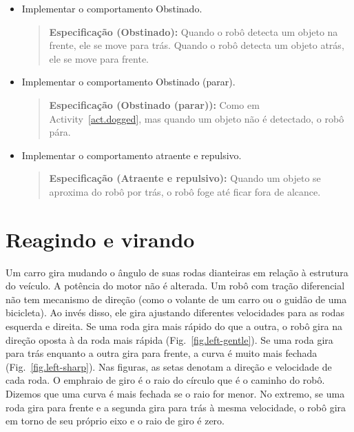 \begin{framed}
\begin{itemize}
\item Implementar o comportamento Obstinado.
\begin{quote}
\normalsize\noindent\textbf{Especificação (Obstinado):} Quando o robô detecta um objeto na frente, ele se move para trás. Quando o robô detecta um objeto atrás, ele se move para frente.
\end{quote}
\end{itemize}
\end{framed}

\begin{framed}
\begin{itemize}
\item Implementar o comportamento Obstinado (parar).
\begin{quote}
\normalsize\noindent\textbf{Especificação (Obstinado (parar)):} Como em Activity~\ref{act.dogged}, mas quando um objeto não é detectado, o robô pára.
\end{quote}
\end{itemize}
\end{framed}

\begin{framed}
\begin{itemize}
\item Implementar o comportamento atraente e repulsivo.
\begin{quote}
\normalsize\noindent\textbf{Especificação (Atraente e repulsivo):} Quando um objeto se aproxima do robô por trás, o robô foge até ficar fora de alcance.
\end{quote}
\end{itemize}
\end{framed}

\section{Reagindo e virando}\label{s.turning}

Um carro gira mudando o ângulo de suas rodas dianteiras em relação à estrutura do veículo. A potência do motor não é alterada. Um robô com tração diferencial não tem mecanismo de direção (como o volante de um carro ou o guidão de uma bicicleta). Ao invés disso, ele gira ajustando diferentes velocidades para as rodas esquerda e direita. Se uma roda gira mais rápido do que a outra, o robô gira na direção oposta à da roda mais rápida (Fig.~\ref{fig.left-gentle}). Se uma roda gira para trás enquanto a outra gira para frente, a curva é muito mais fechada (Fig.~\ref{fig.left-sharp}). Nas figuras, as setas denotam a direção e velocidade de cada roda. O emph{raio de giro} é o raio do círculo que é o caminho do robô. Dizemos que uma curva é mais fechada se o raio for menor. No extremo, se uma roda gira para frente e a segunda gira para trás à mesma velocidade, o robô gira em torno de seu próprio eixo e o raio de giro é zero.

